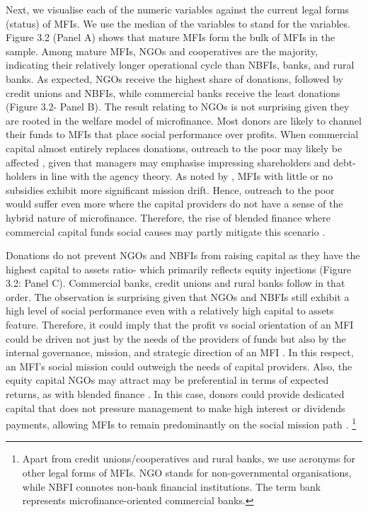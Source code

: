 \documentclass[a4paper, nobind]{templates/ociamthesis}
\begin{document}
Next, we visualise each of the numeric variables against the current legal forms (status) of MFIs. We use the median of the variables to stand for the variables. Figure 3.2 (Panel A) shows that mature MFIs form the bulk of MFIs in the sample. Among mature MFIs, NGOs and cooperatives are the majority, indicating their relatively longer operational cycle than NBFIs, banks, and rural banks. As expected, NGOs receive the highest share of donations, followed by credit unions and NBFIs, while commercial banks receive the least donations (Figure 3.2- Panel B). The result relating to NGOs is not surprising given they are rooted in the welfare model of microfinance. Most donors are likely to channel their funds to MFIs that place social performance over profits. When commercial capital almost entirely replaces donations, outreach to the poor may likely be affected \autocite{roberts2013profit}, given that managers may emphasise impressing shareholders and debt-holders in line with the agency theory. As noted by \textcite{d2013unsubsidized}, MFIs with little or no subsidies exhibit more significant mission drift. Hence, outreach to the poor would suffer even more where the capital providers do not have a sense of the hybrid nature of microfinance. Therefore, the rise of blended finance where commercial capital funds social causes may partly mitigate this scenario \autocite{attridge2019blended}.

Donations do not prevent NGOs and NBFIs from raising capital as they have the highest capital to assets ratio- which primarily reflects equity injections (Figure 3.2: Panel C). Commercial banks, credit unions and rural banks follow in that order. The observation is surprising given that NGOs and NBFIs still exhibit a high level of social performance even with a relatively high capital to assets feature. Therefore, it could imply that the profit vs social orientation of an MFI could be driven not just by the needs of the providers of funds but also by the internal governance, mission, and strategic direction of an MFI \autocite{campion1999institutional}. In this respect, an MFI's social mission could outweigh the needs of capital providers. Also, the equity capital NGOs may attract may be preferential in terms of expected returns, as with blended finance \autocite{rode2019blended}. In this case, donors could provide dedicated capital that does not pressure management to make high interest or dividends payments, allowing MFIs to remain predominantly on the social mission path \autocite{lopatta2016microfinance}. \footnote{Apart from credit unions/cooperatives and rural banks, we use acronyms for other legal forms of MFIs. NGO stands for non-governmental organisations, while NBFI connotes non-bank financial institutions. The term bank represents microfinance-oriented commercial banks.}
\end{document}
